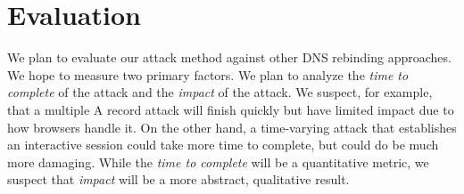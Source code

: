 \section{Evaluation}
\label{sec:eval}

We plan to evaluate our attack method against other DNS rebinding approaches. We hope to measure two primary factors. We plan to analyze the \emph{time to complete} of the attack and the \emph{impact} of the attack. We suspect, for example, that a multiple A record attack will finish quickly but have limited impact due to how browsers handle it. On the other hand, a time-varying attack that establishes an interactive session could take more time to complete, but could do be much more damaging. While the \emph{time to complete} will be a quantitative metric, we suspect that \emph{impact} will be a more abstract, qualitative result.

